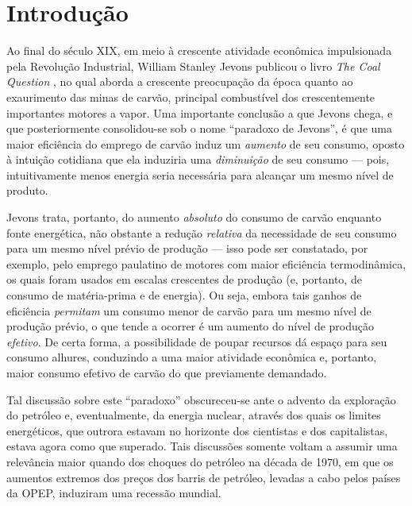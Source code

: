

\chapter{Introdução}
\label{cap:intro} %
Ao final do século XIX, em meio à crescente atividade econômica impulsionada pela Revolução Industrial, William Stanley Jevons publicou o livro \textit{The Coal Question} \citeyear{Jevons1866}, no qual aborda a crescente preocupação da época quanto ao exaurimento das minas de carvão, principal combustível dos crescentemente importantes motores a vapor. Uma importante conclusão a que Jevons chega, e que posteriormente consolidou-se sob o nome ``paradoxo de Jevons'', é que uma maior eficiência do emprego de carvão induz um \textit{aumento} de seu consumo, oposto à intuição cotidiana que ela induziria uma \textit{diminuição} de seu consumo --- pois, intuitivamente menos energia seria necessária para alcançar um mesmo nível de produto. 

Jevons trata, portanto, do aumento \textit{absoluto} do consumo de carvão enquanto fonte energética, não obstante a redução \textit{relativa} da necessidade de seu consumo para um mesmo nível prévio de produção --- isso pode ser constatado, por exemplo, pelo emprego paulatino de motores com maior eficiência termodinâmica, os quais foram usados em escalas crescentes de produção (e, portanto, de consumo de matéria-prima e de energia). Ou seja, embora tais ganhos de eficiência \textit{permitam} um consumo menor de carvão para um mesmo nível de produção prévio, o que tende a ocorrer é um aumento do nível de produção \textit{efetivo}. De certa forma, a possibilidade de poupar recursos dá espaço para seu consumo alhures, conduzindo a uma maior atividade econômica e, portanto, maior consumo efetivo de carvão do que previamente demandado.

Tal discussão sobre este ``paradoxo'' obscureceu-se ante o advento da exploração do petróleo e, eventualmente, da energia nuclear, através dos quais os limites energéticos, que outrora estavam no horizonte dos cientistas e dos capitalistas, estava agora como que superado. Tais discussões somente voltam a assumir uma relevância maior quando dos choques do petróleo na década de 1970, em que os aumentos extremos dos preços dos barris de petróleo, levadas a cabo pelos países da OPEP, induziram uma recessão mundial. 

